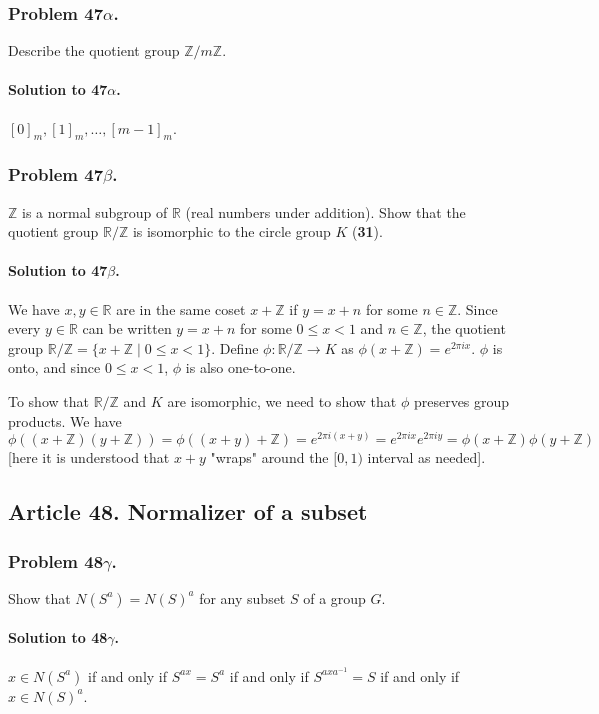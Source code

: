 \subsubsection{Problem 47$\alpha$.}
Describe the quotient group $\mathbb{Z} / m\mathbb{Z}$.

\paragraph*{Solution to 47$\alpha$.}
$[0]_m, [1]_m, \dots, [m-1]_m$.

\subsubsection{Problem 47$\beta$.}
$\mathbb{Z}$ is a normal subgroup of $\mathbb{R}$ (real numbers under addition).
Show that the quotient group $\mathbb{R/Z}$ is isomorphic to the circle group
$K$ (\textbf{31}).

\paragraph*{Solution to 47$\beta$.}
We have $x, y \in \mathbb{R}$ are in the same coset $x + \mathbb{Z}$ if
$y = x + n$ for some $n \in \mathbb{Z}$. Since every $ y \in \mathbb{R} $ can
be written $ y = x + n$ for some $ 0 \leq x < 1 $ and $ n \in \mathbb{Z}$, the
quotient group $\mathbb{R/Z} = \{ x + \mathbb{Z} \mid 0 \leq x < 1 \}$.
Define $\phi : \mathbb{R/Z} \rightarrow K$ as
$\phi (x+\mathbb{Z}) = e^{2\pi i x}$. $\phi$ is onto, and since $ 0 \leq x < 1$,
$\phi$ is also one-to-one.

To show that $\mathbb{R/Z}$ and $K$ are isomorphic, we need to show that $\phi$
preserves group products. We have
$ \phi ((x+\mathbb{Z})(y+\mathbb{Z})) = \phi ((x+y)+\mathbb{Z}) = e^{2\pi i (x+y)}
= e^{2\pi i x}e^{2 \pi i y} = \phi (x+\mathbb{Z}) \phi (y+\mathbb{Z})$ [here it
is understood that $x+y$ "wraps" around the $[0,1)$ interval as needed].

\subsection{Article 48. Normalizer of a subset}
\subsubsection{Problem 48$\gamma$.}
Show that $N(S^a) = N(S)^a$ for any subset $S$ of a group $G$.

\paragraph*{Solution to 48$\gamma$.}
$x \in N(S^a)$ if and only if $S^{ax} = S^a$ if and only if $S^{axa^{-1}} = S$
if and only if $x \in N(S)^a$.

